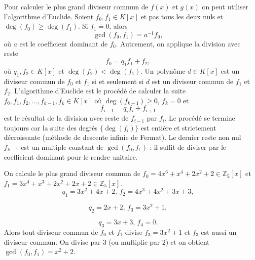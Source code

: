 Pour calculer le plus grand diviseur commun de $f(x)$ et $g(x)$  on peut utiliser l'algorithme d'Euclide. Soient $f_0,f_1 ∈K[x]$  et  pas tous les deux nuls et $\deg(f_0) ≥ \deg(f_1)$. Si $f_1 = 0$, alors
\begin{displaymath}
\gcd(f_0,f_1) =   a^{-1}f_0, 
\end{displaymath}
où $a$ est le coefficient dominant de $f_0$. 
Autrement, on applique la division avec reste
\begin{displaymath}
  f_0 = q_1 f_1 + f_2, 
\end{displaymath}
où $q_1,f_2 ∈K[x]$ et $ \deg(f_2)< \deg(f_1)$. Un polynôme  $d ∈K[x]$ est un diviseur commun de $f_0$ et $f_1$ si et seulement si $d$ est un diviseur commun de $f_1$ et $f_2$. L'algorithme d'Euclide est le procédé de calculer la suite $f_0,f_1,f_2,\dots,f_{k-1},f_k ∈K[x]$  où $\deg(f_{k-1})≥0$, $f_k=0$ et 
\begin{displaymath}
  f_{i-1} = q_i f_i + f_{i+1} 
\end{displaymath}
est le résultat de la division avec reste de $f_{i-1} $ par $f_i$. Le procédé se termine toujours car la suite des degrés $\{\deg(f_i)\}$ est entière et strictement décroissante (méthode de descente infinie de Fermat). Le dernier reste non nul $f_{k-1}$ est un multiple constant de $\gcd(f_0,f_1)$ : il suffit de diviser par le coefficient dominant pour le rendre unitaire.


\begin{example}
  \label{exe:25-b}
  On calcule le plus grand diviseur commun de
$f_0 =  4 x^{6} + x^{4} + 2 x^{2} + 2 ∈ℤ_5[x]$  et 
$f_1 =  3 x^{4} + x^{3} + 2 x^{2} + 2 x + 2 ∈ℤ_5[x]$. 
  \begin{displaymath}
   q_1 =  3 x^{2} + 4 x + 2, \, 
   f_2 =  4 x^{3} + 4 x^{2} + 3 x + 3, 
 \end{displaymath}

 \begin{displaymath}
   q_2 =  2 x + 2, \, 
f_3 =  3 x^{2} + 1, 
\end{displaymath}

\begin{displaymath}
  q_3 =  3 x + 3, \, 
  f_4 =  0. 
\end{displaymath}
Alors tout diviseur commun de $f_0$ et $f_1$ divise $f_3 =  3 x^{2} + 1$ et $f_3$ est aussi un diviseur commun. On divise par $3$ (ou multiplie par $2$) et on obtient  $\gcd(f_0,f_1) = x^2 +2$. 

\end{example}

